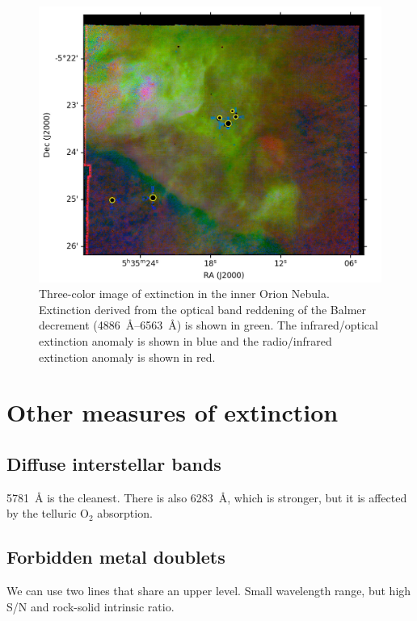 \documentclass[twocolumn, times]{aastex63}
\newcommand*\chem[1]{\ensuremath{\mathrm{#1}}}
\begin{document}
\begin{figure}
  \includegraphics[width=\linewidth]{figs/rgb-lupton-extinction}
  \caption{Three-color image of extinction in the inner Orion
    Nebula. Extinction derived from the optical band reddening of the
    Balmer decrement (\SIrange{4886}{6563}{\angstrom}) is shown in
    green.  The infrared/optical extinction anomaly is shown in blue
    and the radio/infrared extinction anomaly is shown in red.}
  \label{fig:3color-extinction}
\end{figure}

\section{Other measures of extinction}
\label{sec:other-meas-extinct}

\subsection{Diffuse interstellar bands}
\label{sec:diff-interst-bands}

\SI{5781}{\angstrom} is the cleanest.
There is also \SI{6283}{\angstrom},
which is stronger,
but it is affected by the telluric \chem{O_2} absorption.


\subsection{Forbidden metal doublets}
\label{sec:forb-metal-doubl}

We can use two lines that share an upper level.
Small wavelength range, but high S/N and rock-solid intrinsic ratio.
\end{document}
